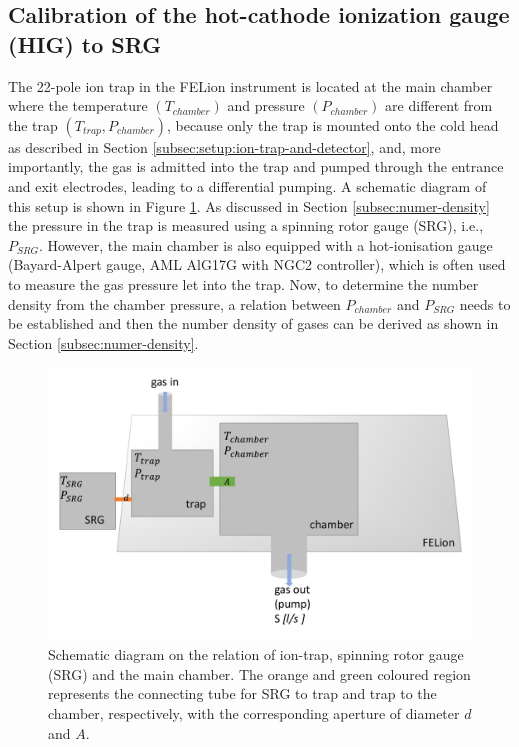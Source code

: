 \subsection{Calibration of the hot-cathode ionization gauge (HIG) to SRG}
\label{subsec:calibration:HIG-SRG}

The 22-pole ion trap in the FELion instrument is located at the main chamber
where the temperature $(T_{chamber})$ and pressure $(P_{chamber})$ are
different from the trap $(T_{trap}, P_{chamber})$, because only the trap is
mounted onto the cold head as described in Section
\ref{subsec:setup:ion-trap-and-detector}, and, more importantly, the gas is
admitted into the trap and pumped through the entrance and exit electrodes,
leading to a differential pumping. A schematic diagram of this setup is shown
in Figure \ref{fig:HIG}. As discussed in Section \ref{subsec:numer-density} the
pressure in the trap is measured using a spinning rotor gauge (SRG), i.e.,
$P_{SRG}$. However, the main chamber is also equipped with a hot-ionisation
gauge (Bayard-Alpert gauge, AML AlG17G with NGC2 controller), which is often
used to measure the gas pressure let into the trap. Now, to determine the
number density from the chamber pressure, a relation between $P_{chamber}$ and
$P_{SRG}$ needs to be established and then the number density of gases can be
derived as shown in Section \ref{subsec:numer-density}.\\

\begin{figure}[!htb]
    \centering
    \includegraphics[scale=0.5]{figures/Instruments/HIG calibration.pdf}
    \caption{Schematic diagram on the relation of ion-trap, spinning rotor gauge (SRG) and the main chamber. The orange and green coloured region represents the connecting tube for SRG to trap and trap to the chamber, respectively, with the corresponding aperture of diameter $d$ and $A$.}
    \label{fig:HIG}
\end{figure}


